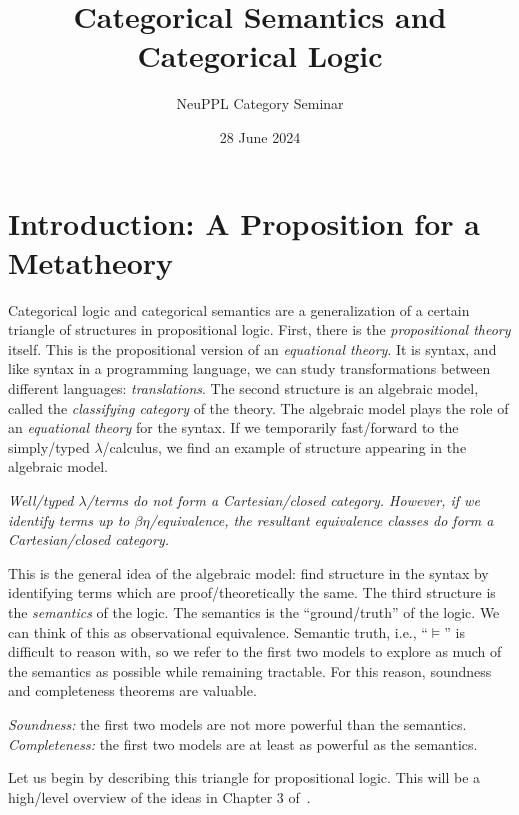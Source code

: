 \documentclass{../thesis-note}
\title{Categorical Semantics and Categorical Logic}
\author{NeuPPL Category Seminar}
\date{28 June 2024}
\begin{document}
\maketitle%

\section{Introduction: A Proposition for a Metatheory}

Categorical logic and categorical semantics are a generalization of a certain
triangle of structures in propositional logic. First, there is the
\emph{propositional theory} itself. This is the propositional version of an
\emph{equational theory}. It is syntax, and like syntax in a programming
language, we can study transformations between different languages:
\emph{translations}. The second structure is an algebraic model, called the
\emph{classifying category} of the theory. The algebraic model plays the role of
an \emph{equational theory} for the syntax. If we temporarily fast\-/forward to
the simply\-/typed \(\lambda\)\-/calculus, we find an example of structure
appearing in the algebraic model.
\begin{indented}
  \emph{%
    Well\-/typed \(\lambda\)\-/terms do not form a Cartesian\-/closed
    category. However, if we identify terms up to \(\beta\eta\)\-/equivalence,
    the resultant equivalence classes do form a Cartesian\-/closed category.
  }%
\end{indented}
\noindent This is the general idea of the algebraic model: find structure in the
syntax by identifying terms which are proof\-/theoretically the same. The third
structure is the \emph{semantics} of the logic. The semantics is the
``ground\-/truth'' of the logic. We can think of this as observational
equivalence. Semantic truth, i.e., ``\(\vDash\)'' is difficult to reason with,
so we refer to the first two models to explore as much of the semantics as
possible while remaining tractable. For this reason, soundness and completeness
theorems are valuable.
\begin{indented}
  \emph{Soundness:} the first two models are not more powerful than the
  semantics.\\
  \emph{Completeness:} the first two models are at least as powerful as the
  semantics.
\end{indented}
Let us begin by describing this triangle for propositional logic. This will be a
high\-/level overview of the ideas in Chapter 3 of~\cite{Halvorson2019}.
\end{document}

